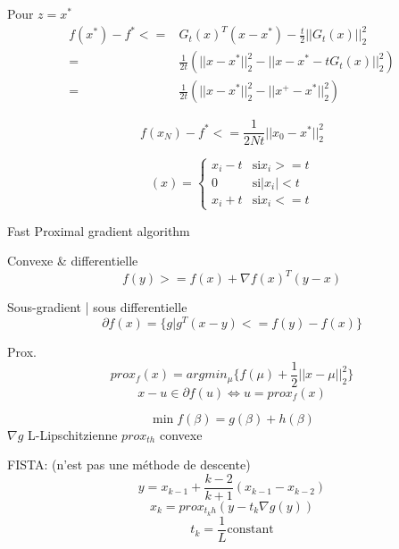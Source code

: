 \documentclass{article}
\begin{document}
Pour $z=x^*$
\begin{equation}
\begin{split}
f(x^*)-f^*<=&G_t(x)^T(x-x^*)-\frac{t}{2}||G_t(x)||_2^2\\
=& \frac{1}{2t}(||x-x^*||_2^2-||x-x^*-tG_t(x)||_2^2)\\
=& \frac{1}{2t}(||x-x^*||_2^2-||x^+-x^*||_2^2)
\end{split}
\end{equation}

\begin{equation}
f(x_N)-f^*<=\frac{1}{2Nt}||x_0-x^*||_2^2
\end{equation}

\begin{equation}
[prox_{t||\dot||}_1](x)=\left\{\begin{array}{rcl}
x_i-t & \text{si} x_i>=t\\
0 & \text{si} |x_i|<t\\
x_i+t & \text{si} x_i <=t
\end{array}\right.
\end{equation}

Fast Proximal gradient algorithm

Convexe \& differentielle
\begin{equation}
f(y)>=f(x)+\nabla f(x)^T(y-x)
\end{equation}

Sous-gradient | sous differentielle
\begin{equation}
\partial f(x)=\{g|g^T(x-y)<=f(y)-f(x)\}
\end{equation}

Prox.
\begin{equation}
prox_f (x) = argmin_\mu \{f(\mu)+\frac{1}{2}||x-\mu||^2_2\}
\end{equation}
\begin{equation}
x-u\in\partial f(u) \Leftrightarrow u=prox_f (x)
\end{equation}

\begin{equation}
\min f(\beta)=g(\beta)+h(\beta)
\end{equation}
$\nabla g$ L-Lipschitzienne
$prox_{th}$ convexe

FISTA:
(n'est pas une m\'ethode de descente)
\begin{equation}
y = x_{k-1}+\frac{k-2}{k+1}(x_{k-1}-x_{k-2})
\end{equation}
\begin{equation}
x_k=prox_{t_k h}(y-t_k\nabla g(y))
\end{equation}
\begin{equation}
t_k=\frac{1}{L} \text{constant}
\end{equation}
\end{document}
